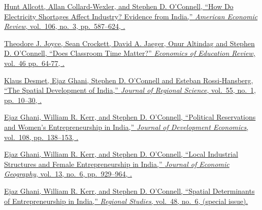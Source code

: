 \documentclass[letterpaper,10pt,oneside]{article}
\begin{document}
\begin{body}
\EntryGapNoBreak
\href{http://www.stephenoconnell.org/assets/papers/ACWO2016_AER_Shortages.pdf}
{Hunt Allcott, Allan Collard-Wexler, and Stephen D. O'Connell,
``How Do Electricity Shortages Affect Industry? Evidence from India,''
\textit{American Economic Review},
vol.~106,
no.~3,
pp.~587--624,
.}

\EntryGapNoBreak
\href{http://www.djaeger.org/research/pubs/EER_forthcoming.pdf}
{Theodore J. Joyce, Sean Crockett, David A. Jaeger, Onur Altindag and Stephen D. O'Connell,
``Does Classroom Time Matter?''
\textit{Economics of Education Review},
vol.~46
pp.~64-77,
.}




\EntryGapNoBreak
\href{http://elibrary.worldbank.org/doi/abs/10.1596/1813-9450-6060}
{Klaus Desmet, Ejaz Ghani, Stephen D. O'Connell and Esteban Rossi-Hansberg,
``The Spatial Development of India,''
\textit{Journal of Regional Science},
vol.~55,
no.~1,
pp.~10--30,
.}

\EntryGapNoBreak

\href{http://www.stephenoconnell.org/assets/papers/GKO_ReservationsEntry.pdf}
{Ejaz Ghani, William R. Kerr, and Stephen D. O'Connell,
``Political Reservations and Women's Entrepreneurship in India,''
\textit{Journal of Development Economics},
vol.~108,
pp.~138--153,
.}


\EntryGapNoBreak

\href{http://www.stephenoconnell.org/assets/papers/Ghani_Kerr_OConnell_JEG13.pdf}
{Ejaz Ghani, William R. Kerr, and Stephen D. O'Connell,
``Local Industrial Structures and Female Entrepreneurship in India,''
\textit{Journal of Economic Geography},
vol.~13,
no.~6,
pp.~929--964,
.}

\EntryGapNoBreak

\href{http://www.stephenoconnell.org/assets/papers/Ghani_Kerr_OConnell_RS_2013.pdf}
{Ejaz Ghani, William R. Kerr, and Stephen D. O'Connell,
``Spatial Determinants of Entrepreneurship in India,''
\textit{Regional Studies},
vol.~48,
no.~6,
 (special issue).} 


\end{body}
\end{document}

